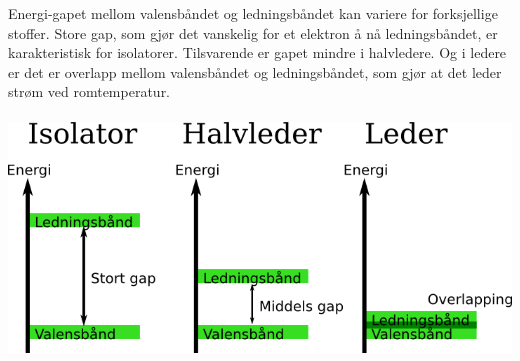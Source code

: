 Energi-gapet mellom valensbåndet og ledningsbåndet
kan variere for forksjellige stoffer.
Store gap, som gjør det vanskelig for et elektron å nå ledningsbåndet,
er karakteristisk for isolatorer.
Tilsvarende er gapet mindre i halvledere.
Og i ledere er det er overlapp mellom valensbåndet og ledningsbåndet,
som gjør at det leder strøm ved romtemperatur.
\\\\
\includegraphics[width=\textwidth]{./img/energigap}

